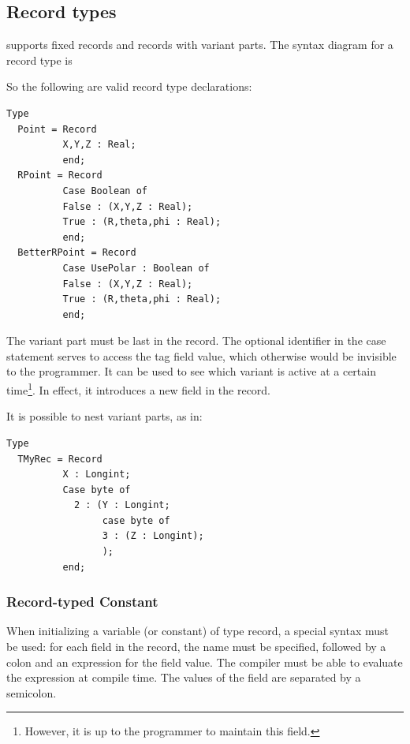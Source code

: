 \subsection{Record types}
\fpc supports fixed records and records with variant parts.
The syntax diagram for a record type is

 So the following are valid record type declarations:
\begin{verbatim}
Type
  Point = Record
          X,Y,Z : Real;
          end;
  RPoint = Record
          Case Boolean of
          False : (X,Y,Z : Real);
          True : (R,theta,phi : Real);
          end;
  BetterRPoint = Record
          Case UsePolar : Boolean of
          False : (X,Y,Z : Real);
          True : (R,theta,phi : Real);
          end;
\end{verbatim}
The variant part must be last in the record. The optional identifier in the
case statement serves to access the tag field value, which otherwise would
be invisible to the programmer. It can be used to see which variant is
active at a certain time\footnote{However, it is up to the programmer to maintain
this field.}. In effect, it introduces a new field in the record.
\begin{remark}
It is possible to nest variant parts, as in:
\begin{verbatim}
Type
  TMyRec = Record
          X : Longint;
          Case byte of
            2 : (Y : Longint;
                 case byte of
                 3 : (Z : Longint);
                 );
          end;
\end{verbatim}
\end{remark}

\subsubsection{Record-typed Constant}
When initializing a variable (or constant) of type record, a special syntax must be used:
for each field in the record, the name must be specified, followed by a colon and an expression for the field value.
The compiler must be able to evaluate the expression at compile time.
The values of the field are separated by a semicolon.



